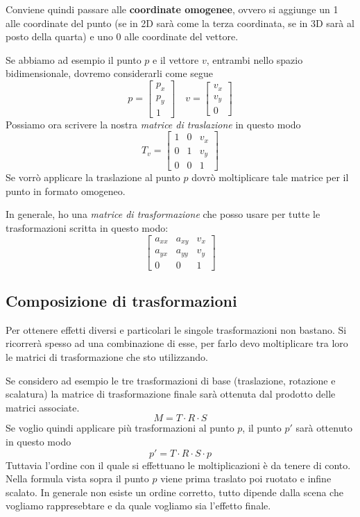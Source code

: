 Conviene quindi passare alle \textbf{coordinate omogenee}, ovvero si aggiunge un 1 alle
coordinate del punto (se in 2D sar\`a come la terza coordinata, se in 3D sar\`a al posto
della quarta) e uno 0 alle coordinate del vettore.

Se abbiamo ad esempio il punto $p$ e il vettore $v$, entrambi nello spazio bidimensionale,
dovremo considerarli come segue
\[
	p = \begin{bmatrix}
		p_x \\ p_y \\ 1
	\end{bmatrix} \quad
	v = \begin{bmatrix}
		v_x \\ v_y \\ 0
	\end{bmatrix}
\]
Possiamo ora scrivere la nostra \emph{matrice di traslazione} in questo modo
\[
	T_v = \begin{bmatrix}
		1 & 0 & v_x \\
		0 & 1 & v_y \\
		0 & 0 & 1
	\end{bmatrix}
\]
Se vorr\`o applicare la traslazione al punto $p$ dovr\`o moltiplicare tale matrice per il punto
in formato omogeneo.

In generale, ho una \emph{matrice di trasformazione} che posso usare per tutte le trasformazioni
scritta in questo modo:
\[
	\begin{bmatrix}
		a_{xx} & a_{xy} & v_x \\
		a_{yx} & a_{yy} & v_y \\
		0      & 0      & 1
	\end{bmatrix}
\]

\subsection{Composizione di trasformazioni}
Per ottenere effetti diversi e particolari le singole trasformazioni non bastano. Si ricorrer\`a
spesso ad una combinazione di esse, per farlo devo moltiplicare tra loro le matrici di
trasformazione che sto utilizzando.

Se considero ad esempio le tre trasformazioni di base (traslazione, rotazione e scalatura) la
matrice di trasformazione finale sar\`a ottenuta dal prodotto delle matrici associate.
\[ M = T \cdot R \cdot S \]
Se voglio quindi applicare pi\`u trasformazioni al punto $p$, il punto $p'$ sar\`a ottenuto in
questo modo
\[ p' = T \cdot R \cdot S \cdot p \]
Tuttavia l'ordine con il quale si effettuano le moltiplicazioni \`e da tenere di conto.
Nella formula vista sopra il punto $p$ viene prima traslato poi ruotato e infine scalato.
In generale non esiste un ordine corretto, tutto dipende dalla scena che vogliamo rappresebtare
e da quale vogliamo sia l'effetto finale.


